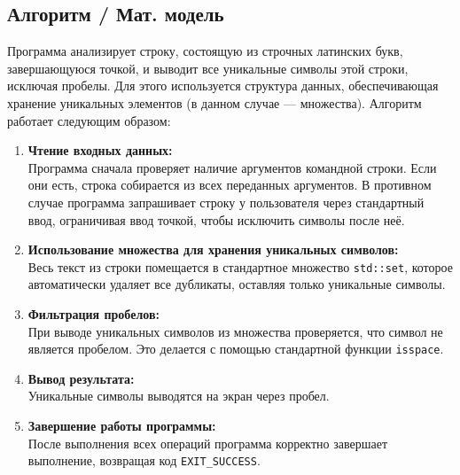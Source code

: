 \documentclass[14pt,a4paper]{article}
\begin{document}
\subsection{Алгоритм / Мат. модель}
Программа анализирует строку, состоящую из строчных латинских букв,
завершающуюся точкой, и выводит все уникальные символы этой строки, исключая
пробелы. Для этого используется структура данных, обеспечивающая хранение
уникальных элементов (в данном случае — множества). Алгоритм работает следующим
образом:
\begin{enumerate}
  \item \textbf{Чтение входных данных:}\\
    Программа сначала проверяет наличие аргументов командной строки. Если они
    есть, строка собирается из всех переданных аргументов. В противном случае
    программа запрашивает строку у пользователя через стандартный ввод,
    ограничивая ввод точкой, чтобы исключить символы после неё.
  \item \textbf{Использование множества для хранения уникальных символов:}\\
    Весь текст из строки помещается в стандартное множество \texttt{std::set},
    которое автоматически удаляет все дубликаты, оставляя только уникальные
    символы.
  \item \textbf{Фильтрация пробелов:}\\
    При выводе уникальных символов из множества проверяется, что символ не
    является пробелом. Это делается с помощью стандартной функции
    \texttt{isspace}.
  \item \textbf{Вывод результата:}\\
    Уникальные символы выводятся на экран через пробел.
  \item \textbf{Завершение работы программы:}\\
    После выполнения всех операций программа корректно завершает выполнение,
    возвращая код \texttt{EXIT\_SUCCESS}.
\end{enumerate}
\begin{table}[H]
  \centering
  \caption{Переменные, функции и структуры, используемые в программе}
  \label{tabel:1}
\end{table}
\end{document}
